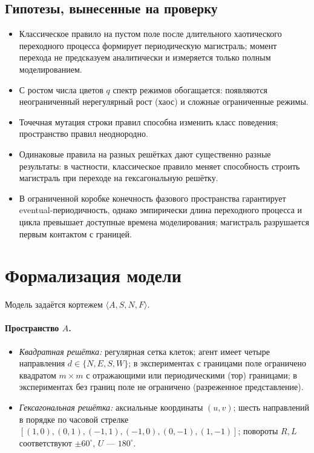 \documentclass[12pt,a4paper]{article}
\begin{document}
	\subsection{Гипотезы, вынесенные на проверку}
	\begin{itemize}
		\item Классическое правило на пустом поле после длительного хаотического переходного процесса формирует периодическую магистраль; момент перехода не предсказуем аналитически и измеряется только полным моделированием.
		\item С ростом числа цветов $q$ спектр режимов обогащается: появляются неограниченный нерегулярный рост (хаос) и сложные ограниченные режимы.
		\item Точечная мутация строки правил способна изменить класс поведения; пространство правил неоднородно.
		\item Одинаковые правила на разных решётках дают существенно разные результаты: в частности, классическое правило меняет способность строить магистраль при переходе на гексагональную решётку.
		\item В ограниченной коробке конечность фазового пространства гарантирует eventual-периодичность, однако эмпирически длина переходного процесса и цикла превышает доступные времена моделирования; магистраль разрушается первым контактом с границей.
	\end{itemize}
	
	\section{Формализация модели}
	
	Модель задаётся кортежем $\langle A,S,N,F\rangle$.
	
	\paragraph{Пространство $A$.}
	\begin{itemize}
		\item \emph{Квадратная решётка:} регулярная сетка клеток; агент имеет четыре направления $d\in\{N,E,S,W\}$; в экспериментах с границами поле
		ограничено квадратом $m\times m$ с отражающими или периодическими (тор) границами; в экспериментах без границ поле не ограничено (разреженное представление).
		\item \emph{Гексагональная решётка:} аксиальные координаты $(u,v)$; шесть направлений в порядке по часовой стрелке
		$[(1,0),(0,1),(-1,1),(-1,0),(0,-1),(1,-1)]$; повороты $R,L$ соответствуют $\pm60^\circ$, $U$ --- $180^\circ$.
	\end{itemize}
	
\end{document}
